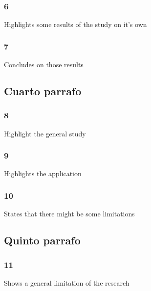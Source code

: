 \documentclass[]{article}
\begin{document}
\hypertarget{section-3}{%
\subsubsection{6}\label{section-3}}

Highlights some results of the study on it's own

\hypertarget{section-4}{%
\subsubsection{7}\label{section-4}}

Concludes on those results

\hypertarget{cuarto-parrafo}{%
\subsection{Cuarto parrafo}\label{cuarto-parrafo}}

\hypertarget{section-5}{%
\subsubsection{8}\label{section-5}}

Highlight the general study

\hypertarget{section-6}{%
\subsubsection{9}\label{section-6}}

Highlights the application

\hypertarget{section-7}{%
\subsubsection{10}\label{section-7}}

States that there might be some limitations

\hypertarget{quinto-parrafo}{%
\subsection{Quinto parrafo}\label{quinto-parrafo}}

\hypertarget{section-8}{%
\subsubsection{11}\label{section-8}}

Shows a general limitation of the research
\end{document}
